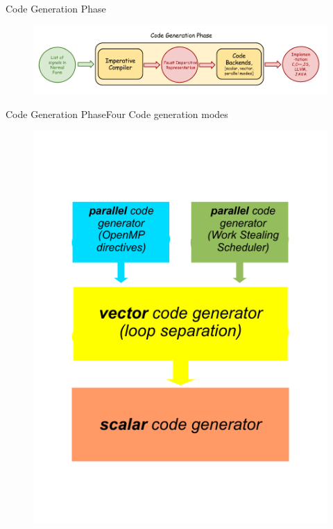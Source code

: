 
\begin{frame}[fragile]{Code Generation Phase}{}

\begin{figure}
\includegraphics[width=1\columnwidth]{images/code-generation-chain}
\end{figure}

\end{frame}


\begin{frame}[fragile]{Code Generation Phase}{Four Code generation modes}

\begin{figure}
\includegraphics[width=0.5\columnwidth]{images/compiler-stack1}
\end{figure}

\end{frame}
 

